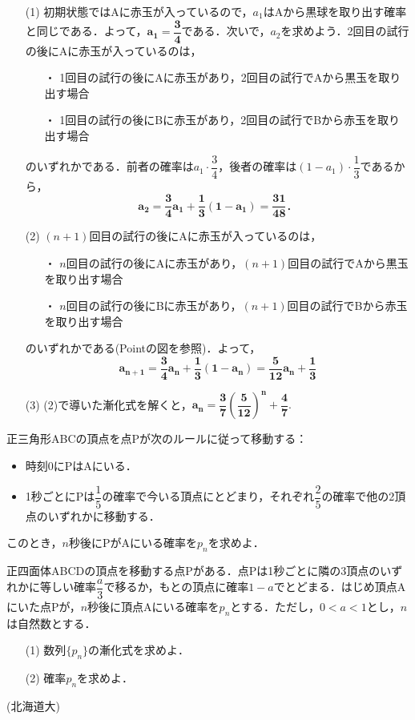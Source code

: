 \documentclass[a4paper,11pt]{ltjsarticle}
\begin{document}
\begin{itemize}
    \item [(1)]初期状態ではAに赤玉が入っているので，$a_1$はAから黒球を取り出す確率と同じである．よって，$\boldsymbol{a_1=\dfrac34}$である．次いで，$a_2$を求めよう．2回目の試行の後にAに赤玉が入っているのは，
    \begin{itemize}
        \item [・]1回目の試行の後にAに赤玉があり，2回目の試行でAから黒玉を取り出す場合
        \item [・]1回目の試行の後にBに赤玉があり，2回目の試行でBから赤玉を取り出す場合\\
    \end{itemize}
    のいずれかである．前者の確率は$a_1\cdot\dfrac34$，後者の確率は$(1-a_1)\cdot\dfrac{1}{3}$であるから，
    \[\boldsymbol{a_2=\frac34a_1+\frac13(1-a_1)=\frac {31}{48}}．\]
    \newpage
\item[(2)]$(n+1)$回目の試行の後にAに赤玉が入っているのは，
    \begin{itemize}
        \item [・]$n$回目の試行の後にAに赤玉があり，$(n+1)$回目の試行でAから黒玉を取り出す場合
        \item [・]$n$回目の試行の後にBに赤玉があり，$(n+1)$回目の試行でBから赤玉を取り出す場合 
    \end{itemize}
    のいずれかである(Pointの図を参照)．よって，
    \[\boldsymbol{a_{n+1}=\frac34a_n+\frac13(1-a_n)=\frac{5}{12}a_n+\frac13} \]
    \item[(3)](2)で導いた漸化式を解くと，$\boldsymbol{a_n=\dfrac{3}{7}\left(\dfrac{5}{12}\right)^n+\dfrac47}.$
\end{itemize}
\begin{toi}
正三角形ABCの頂点を点Pが次のルールに従って移動する：
\begin{itemize}
    \item 時刻0にPはAにいる．
    \item 1秒ごとにPは$\dfrac15$の確率で今いる頂点にとどまり，それぞれ$\dfrac25$の確率で他の2頂点のいずれかに移動する．
\end{itemize}
このとき，$n$秒後にPがAにいる確率を$p_n$を求めよ．
\end{toi}
\begin{toi}
正四面体ABCDの頂点を移動する点Pがある．点Pは1秒ごとに隣の3頂点のいずれかに等しい確率$\dfrac a3$で移るか，もとの頂点に確率$1-a$でとどまる．はじめ頂点Aにいた点Pが，$n$秒後に頂点Aにいる確率を$p_n$とする．ただし，$0<a<1$とし，$n$は自然数とする．
\begin{itemize}
    \item [(1)]数列$\{p_n\}$の漸化式を求めよ．
    \item [(2)]確率$p_n$を求めよ．
\end{itemize}
\hfill(北海道大)
\end{toi}
\end{document}
